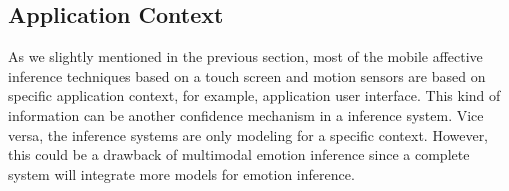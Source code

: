 \subsection{Application Context}\label{subsec:ui}

As we slightly mentioned in the previous section, most of the mobile affective inference techniques based on a touch screen and motion sensors\cite{Gao2012, Shah2015, Mottelson2016, bhattacharya2017predictive} are based on specific application context, for example, application user interface. This kind of information can be another confidence mechanism in a inference system. Vice versa, the inference systems are only modeling for a specific context. However, this could be a drawback of multimodal emotion inference since a complete system will integrate more models for emotion inference.